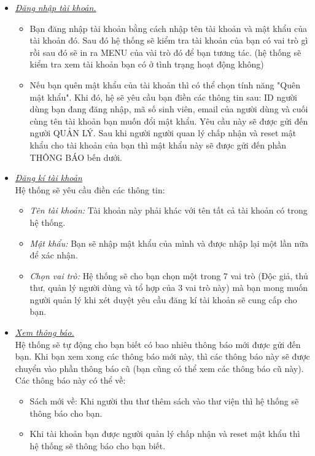 \documentclass[16pt,a4paper,oneside]{article}
\begin{document}
\begin{itemize}
\item \underline{\textit{Đăng nhập tài khoản.}}\\
\begin{itemize}
\item Bạn đăng nhập tài khoản bằng cách nhập tên tài khoản và mật khẩu của tài khoản đó. Sau đó hệ  thống sẽ kiểm tra tài khoản của bạn có vai trò gì rồi sau đó sẽ in ra MENU của vài trò đó để bạn tương tác. (hệ thống sẽ kiểm tra xem tài khoản bạn có ở tình trạng hoạt động không)
\item Nếu bạn quên mật khẩu của tài khoản thì có thể chọn tính năng "Quên mật khẩu". Khi đó, hệ sẽ yêu cầu bạn điền các thông tin sau: ID người dùng bạn đang đăng nhập, mã số sinh viên, email của người dùng và cuối cùng tên tài khoản bạn muốn đổi mật khẩu. Yêu cầu này sẽ được gửi đến người QUẢN LÝ. Sau khi người người quan lý chấp nhận và reset mật khẩu cho tài khoản của bạn thì mật khẩu này sẽ được gửi đến phần THÔNG BÁO bến dưới. 
\end{itemize}
\item \underline{\textit{Đăng kí tài khoản}}\\
Hệ thống sẽ yêu cầu điền các thông tin:
\begin{itemize}
	\item \textit{Tên tài khoản: }Tài khoản này phải khác với tên tất cả tài khoản có trong hệ thống.
	\item \textit{Mật khẩu: }Bạn sẽ nhập mật khẩu của mình và được nhập lại một lần nữa để xác nhận.
	\item \textit{Chọn vai trò: }Hệ thống sẽ cho bạn chọn một trong 7 vai trò (Độc giả, thủ thư, quản lý người dùng và tổ hợp của 3 vai trò này) mà bạn mong muốn người quản lý khi xét duyệt yêu cầu đăng kí tài khoản sẽ cung cấp cho bạn.
\end{itemize}
\item \underline{\textit{Xem thông báo.}}\\
Hệ thống sẽ tự động cho bạn biết có bao nhiêu thông báo mới được gửi đến bạn. Khi bạn xem xong các thông báo mới này, thì các thông báo này sẽ được chuyển vào phần thông báo cũ (bạn cũng có thể xem các thông báo cũ này).\\
Các thông báo này có thể về:
\begin{itemize}
	\item Sách mới về: Khi người thu thư thêm sách vào thư viện thì hệ thống sẽ thông báo cho bạn.
	\item Khi tài khoản bạn được người quản lý chấp nhận và reset mật khẩu thì hệ thống sẽ thông báo cho bạn biết.

\end{itemize}
\end{itemize}
\end{document}
